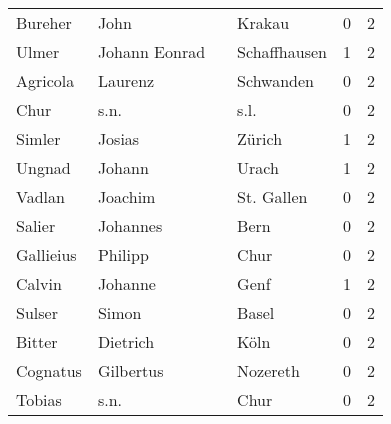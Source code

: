 \documentclass[10pt,a4paper,landscape]{article}
\begin{document}
\begin{longtable}{llllrr}
                  Bureher &                               John &             &                                      Krakau &          0 &         2 \\
                    Ulmer &                      Johann Eonrad &             &                                Schaffhausen &          1 &         2 \\
                 Agricola &                            Laurenz &             &                                   Schwanden &          0 &         2 \\
                     Chur &                               s.n. &             &                                        s.l. &          0 &         2 \\
                   Simler &                             Josias &             &                                      Zürich &          1 &         2 \\
                   Ungnad &                             Johann &             &                                       Urach &          1 &         2 \\
                   Vadlan &                            Joachim &             &                                  St. Gallen &          0 &         2 \\
                   Salier &                           Johannes &             &                                        Bern &          0 &         2 \\
                Gallieius &                            Philipp &             &                                        Chur &          0 &         2 \\
                   Calvin &                            Johanne &             &                                        Genf &          1 &         2 \\
                   Sulser &                              Simon &             &                                       Basel &          0 &         2 \\
                   Bitter &                           Dietrich &             &                                        Köln &          0 &         2 \\
                 Cognatus &                          Gilbertus &             &                                    Nozereth &          0 &         2 \\
                   Tobias &                               s.n. &             &                                        Chur &          0 &         2 \\

\end{longtable}
\end{document}
